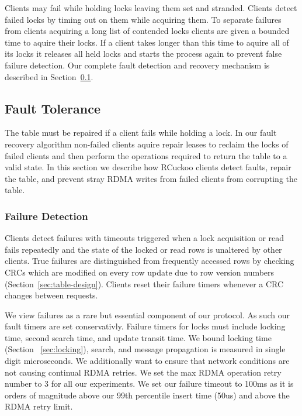 Clients may fail while holding locks leaving them set and
stranded. Clients detect failed locks by timing out on them
while acquiring them. To separate failures from clients
acquiring a long list of contended locks clients are given a
bounded time to aquire their locks. If a client takes longer
than this time to aquire all of its locks it releases all
held locks and starts the process again to prevent false
failure detection. Our complete fault detection and recovery
mechanism is described in Section~\ref{sec:fault-tolerance}.

\subsection{Fault Tolerance}
\label{sec:fault-tolerance}

The table must be repaired if a client fails while holding a
lock. In our fault recovery algorithm non-failed clients
aquire repair leases to reclaim the locks of failed clients
and then perform the operations required to return the table
to a valid state. In this section we describe how RCuckoo
clients detect faults, repair the table, and prevent stray
RDMA writes from failed clients from corrupting the table.

\subsubsection{Failure Detection} 

Clients detect failures with timeouts triggered when a lock
acquisition or read fails repeatedly and the state of the
locked or read rows is unaltered by other clients.  True
failures are distinguished from frequently accessed rows by
checking CRCs which are modified on every row update due to
row version numbers (Section~\ref{sec:table-design}).
Clients reset their failure timers whenever a CRC changes
between requests.


 We view failures
as a rare but essential component of our protocol. As such
our fault timers are set conservativly. Failure timers for
locks must include locking time, second search time, and
update transit time. We bound locking time (Section
~\ref{sec:locking}), search, and message propagation is
measured in single digit microseconds. We additionally want
to ensure that network conditions are not causing continual
RDMA retries. We set the max RDMA operation retry number to
3 for all our experiments. We set our failure timeout to
100ms as it is orders of magnitude above our 99th percentile
insert time (50us) and above the RDMA retry limit.


